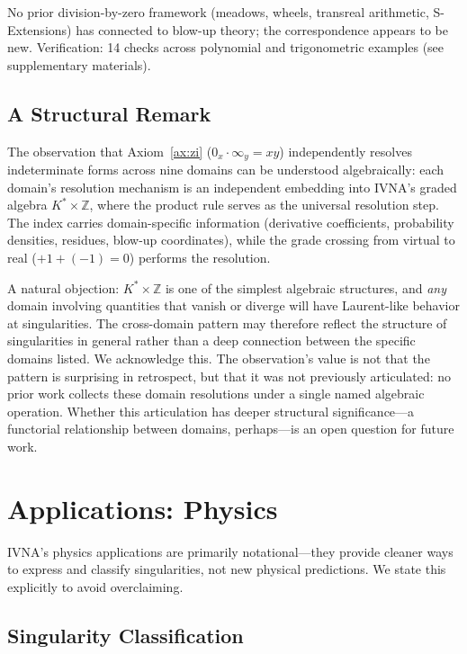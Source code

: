 \documentclass[12pt]{article}
\theoremstyle{definition}
\theoremstyle{remark}
\newcommand{\vz}[1]{0_{#1}}             %
\newcommand{\vi}[1]{\infty_{#1}}        %
\begin{document}
No prior division-by-zero framework (meadows, wheels, transreal
arithmetic, S-Extensions) has connected to blow-up theory; the
correspondence appears to be new. Verification: 14 checks across
polynomial and trigonometric examples (see supplementary materials).

\subsection{A Structural Remark}

The observation that Axiom~\ref{ax:zi} ($\vz{x} \cdot \vi{y} = xy$)
independently resolves indeterminate forms across nine domains can be
understood algebraically: each domain's resolution mechanism is an
independent embedding into IVNA's graded algebra $K^* \times \mathbb{Z}$,
where the product rule serves as the universal resolution step. The
index carries domain-specific information (derivative coefficients,
probability densities, residues, blow-up coordinates), while the
grade crossing from virtual to real ($+1 + (-1) = 0$) performs the
resolution.

A natural objection: $K^* \times \mathbb{Z}$ is one of the simplest
algebraic structures, and \emph{any} domain involving quantities that
vanish or diverge will have Laurent-like behavior at singularities.
The cross-domain pattern may therefore reflect the structure of
singularities in general rather than a deep connection between the
specific domains listed. We acknowledge this. The observation's value
is not that the pattern is surprising in retrospect, but that it
was not previously articulated: no prior work collects these domain
resolutions under a single named algebraic operation. Whether this
articulation has deeper structural significance---a functorial
relationship between domains, perhaps---is an open question for
future work.


\section{Applications: Physics}
\label{sec:physics}

IVNA's physics applications are primarily notational---they provide
cleaner ways to express and classify singularities, not new physical
predictions. We state this explicitly to avoid overclaiming.

\subsection{Singularity Classification}
\end{document}
